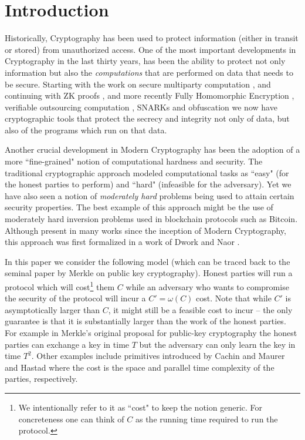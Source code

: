 \section{Introduction}

Historically, Cryptography has been used to protect information (either in transit or stored) from unauthorized access. One of the most important developments in Cryptography in the last thirty years, has been the ability to protect not only information but also the {\em computations} that are performed on data that needs to be secure. Starting with the work on secure multiparty computation \cite{mpc}, and continuing with ZK proofs \cite{zk}, and more recently Fully Homomorphic Encryption \cite{gentry}, verifiable outsourcing computation \cite{muggles,ggp10}, SNARKs \cite{qap,snark-linear} and obfuscation \cite{garg2016candidate} we now have cryptographic tools that protect the secrecy and integrity not only of data, but also of the programs which run on that data. 

Another crucial development in Modern Cryptography has been the adoption of a more ``fine-grained" notion of computational hardness and security. The traditional cryptographic approach modeled computational tasks as ``easy" (for the honest parties to perform) and ``hard" (infeasible for the adversary). Yet we have also seen a notion of {\em moderately hard} problems being used to attain certain security properties. The best example of this approach might be the use of moderately hard inversion problems used in blockchain protocols such as Bitcoin. Although present in many works since the inception of Modern Cryptography, this approach was first 
formalized in a work of Dwork and Naor \cite{dn-spam}. 

In this paper we consider the following model (which can be traced back to the seminal paper by Merkle \cite{merkle} on public key cryptography). Honest parties will run a protocol which will cost\footnote{
We intentionally refer to it as ``cost" to keep the notion generic. For concreteness one can think of $C$ as the running time required to run the protocol.} 
them $C$ while an adversary who wants to compromise the security of the protocol will incur a $C'=\omega(C)$ cost. Note that while $C'$ is asymptotically larger than $C$, it might still be a feasible cost to incur -- the only guarantee is that it is 
substantially larger than the work of the honest parties. For example in Merkle's original proposal for public-key cryptography the honest parties can exchange a key in time $T$ but the adversary can only learn the key in time $T^2$. Other examples include primitives introduced by Cachin and
Maurer \cite{maurer} and Hastad \cite{H87} where 
the cost is the space and parallel time complexity of the parties, respectively. 

